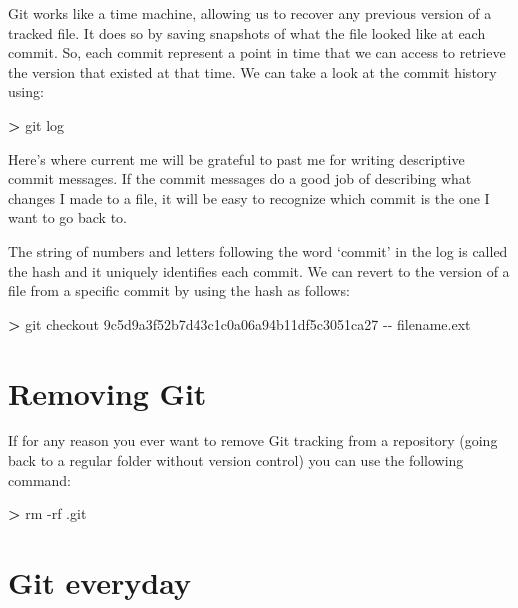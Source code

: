 \documentclass[
]{book}
\newenvironment{Shaded}{\begin{snugshade}}{\end{snugshade}}
\newcommand{\AttributeTok}[1]{\textcolor[rgb]{0.13,0.29,0.53}{#1}}
\newcommand{\ExtensionTok}[1]{#1}
\newcommand{\NormalTok}[1]{#1}
\newcommand{\OperatorTok}[1]{\textcolor[rgb]{0.81,0.36,0.00}{\textbf{#1}}}
\begin{document}
Git works like a time machine, allowing us to recover any previous version of a tracked file. It does so by saving snapshots of what the file looked like at each commit. So, each commit represent a point in time that we can access to retrieve the version that existed at that time. We can take a look at the commit history using:

\begin{Shaded}
\begin{Highlighting}[]
\OperatorTok{\textgreater{}}\NormalTok{ git }\ExtensionTok{log}
\end{Highlighting}
\end{Shaded}

Here's where current me will be grateful to past me for writing descriptive commit messages. If the commit messages do a good job of describing what changes I made to a file, it will be easy to recognize which commit is the one I want to go back to.

The string of numbers and letters following the word `commit' in the log is called the hash and it uniquely identifies each commit. We can revert to the version of a file from a specific commit by using the hash as follows:

\begin{Shaded}
\begin{Highlighting}[]
\OperatorTok{\textgreater{}}\NormalTok{ git }\ExtensionTok{checkout}\NormalTok{ 9c5d9a3f52b7d43c1c0a06a94b11df5c3051ca27 }\AttributeTok{{-}{-}}\NormalTok{ filename.ext}
\end{Highlighting}
\end{Shaded}

\hypertarget{removing-git}{%
\section{Removing Git}\label{removing-git}}

If for any reason you ever want to remove Git tracking from a repository (going back to a regular folder without version control) you can use the following command:

\begin{Shaded}
\begin{Highlighting}[]
\OperatorTok{\textgreater{}}\NormalTok{ rm }\ExtensionTok{{-}rf}\NormalTok{ .git}
\end{Highlighting}
\end{Shaded}

\hypertarget{git-everyday}{%
\section{Git everyday}\label{git-everyday}}
\end{document}
